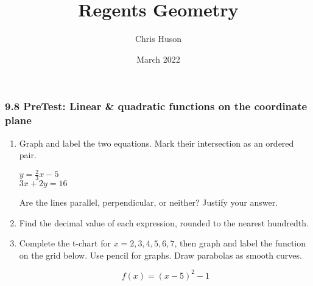 \documentclass[12pt, twoside]{article}
\title{Regents Geometry}
\author{Chris Huson}
\date{March 2022}
\begin{document}
\subsubsection*{9.8 PreTest: Linear \& quadratic functions on the coordinate plane}
  \begin{enumerate}

  \item Graph and label the two equations. Mark their intersection as an ordered pair.

    \begin{multicols}{2}
      $y = \frac{2}{3}x-5$ \\
      $3x+2y = 16$
    \end{multicols}
    Are the lines parallel, perpendicular, or neither? Justify your answer.
    \vspace{1.5cm}

    \begin{center} %
    \end{center}

    \item Find the decimal value of each expression, rounded to the nearest hundredth.
    \begin{enumerate}
    \end{enumerate}
    \vspace{0.5cm}
\newpage

\item Complete the t-chart for $x=2,3,4,5,6,7$, then graph and label the function on the grid below. Use pencil for graphs. Draw parabolas as smooth curves.

    \[f(x) = (x-5)^2-1\]


  \begin{center} %
  \end{center}


\end{enumerate}
\end{document}
